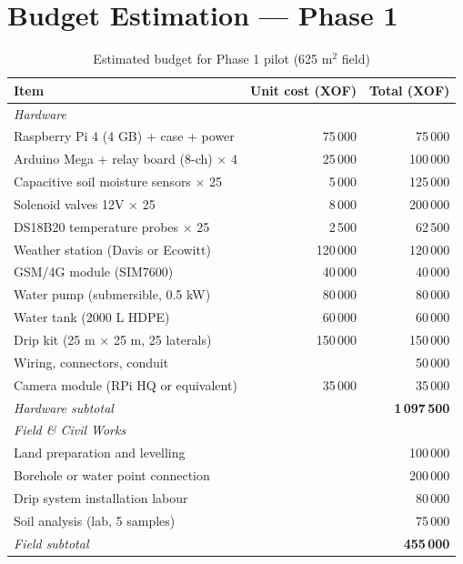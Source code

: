 \documentclass[12pt, a4paper]{report}
\begin{document}
\chapter{Budget Estimation — Phase 1}

\begin{table}[H]
\centering
\caption{Estimated budget for Phase 1 pilot (625 m$^2$ field)}
\label{tab:budget}
\renewcommand{\arraystretch}{1.3}
\begin{tabular}{lrr}
\toprule
\textbf{Item} & \textbf{Unit cost (XOF)} & \textbf{Total (XOF)}\\
\midrule
\multicolumn{3}{l}{\textit{Hardware}}\\
\quad Raspberry Pi 4 (4 GB) + case + power & 75\,000 & 75\,000 \\
\quad Arduino Mega + relay board (8-ch) $\times$ 4 & 25\,000 & 100\,000 \\
\quad Capacitive soil moisture sensors $\times$ 25 & 5\,000 & 125\,000 \\
\quad Solenoid valves 12V $\times$ 25 & 8\,000 & 200\,000 \\
\quad DS18B20 temperature probes $\times$ 25 & 2\,500 & 62\,500 \\
\quad Weather station (Davis or Ecowitt) & 120\,000 & 120\,000 \\
\quad GSM/4G module (SIM7600) & 40\,000 & 40\,000 \\
\quad Water pump (submersible, 0.5 kW) & 80\,000 & 80\,000 \\
\quad Water tank (2000 L HDPE) & 60\,000 & 60\,000 \\
\quad Drip kit (25 m $\times$ 25 m, 25 laterals) & 150\,000 & 150\,000 \\
\quad Wiring, connectors, conduit & & 50\,000 \\
\quad Camera module (RPi HQ or equivalent) & 35\,000 & 35\,000 \\
\midrule
\textit{Hardware subtotal} & & \textbf{1\,097\,500} \\
\midrule
\multicolumn{3}{l}{\textit{Field \& Civil Works}}\\
\quad Land preparation and levelling & & 100\,000 \\
\quad Borehole or water point connection & & 200\,000 \\
\quad Drip system installation labour & & 80\,000 \\
\quad Soil analysis (lab, 5 samples) & & 75\,000 \\
\midrule
\textit{Field subtotal} & & \textbf{455\,000} \\

\end{tabular}
\end{table}
\end{document}
